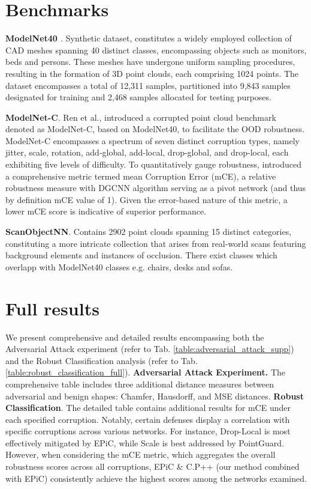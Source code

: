 \documentclass[10pt,twocolumn,letterpaper]{article}
\begin{document}
\section{Benchmarks}
\textbf{ModelNet40 \cite{modelnet40}}.
Synthetic dataset, constitutes a widely employed collection of CAD meshes spanning 40 distinct classes, encompassing objects such as monitors, beds and persons. These meshes have undergone uniform sampling procedures, resulting in the formation of 3D point clouds, each comprising 1024 points. The dataset encompasses a total of 12,311 samples, partitioned into 9,843 samples designated for training and 2,468 samples allocated for testing purposes.

\textbf{ModelNet-C\cite{modelnet_c}}. Ren et al., introduced a corrupted point cloud benchmark denoted as ModelNet-C, based on ModelNet40, to facilitate the OOD robustness. ModelNet-C encompasses a spectrum of seven distinct corruption types, namely jitter, scale, rotation, add-global, add-local, drop-global, and drop-local, each exhibiting five levels of difficulty. To quantitatively gauge robustness, \cite{modelnet_c} introduced a comprehensive metric termed mean Corruption Error (mCE), a relative robustness measure with DGCNN algorithm serving as a pivot network (and thus by definition mCE value of 1). Given the error-based nature of this metric, a lower mCE score is indicative of superior performance. 

\textbf{ScanObjectNN\cite{scanobjectnn}}. Contains 2902 point clouds spanning 15 distinct categories, constituting a more intricate collection that arises from real-world scans featuring background elements and instances of occlusion. There exist classes which overlapp with ModelNet40 classes e.g. chairs, desks and sofas.
\section{Full results}
We present comprehensive and detailed results encompassing both the Adversarial Attack experiment (refer to Tab. \ref{table:adversarial_attack_supp}) and the Robust Classification analysis (refer to Tab. \ref{table:robust_classification_full}). 
\textbf{Adversarial Attack Experiment.} The comprehensive table includes three additional distance measures between adversarial and benign shapes: Chamfer, Hausdorff, and MSE distances.
\textbf{Robust Classification}. The detailed table contains additional results for mCE under each specified corruption. Notably, certain defenses display a correlation with specific corruptions across various networks. For instance, Drop-Local is most effectively mitigated by EPiC\cite{epic}, while Scale is best addressed by PointGuard\cite{pointguard}. However, when considering the mCE metric, which aggregates the overall robustness scores across all corruptions, EPiC \& C.P++ (our method combined with EPiC) consistently achieve the highest scores among the networks examined.
\end{document}

